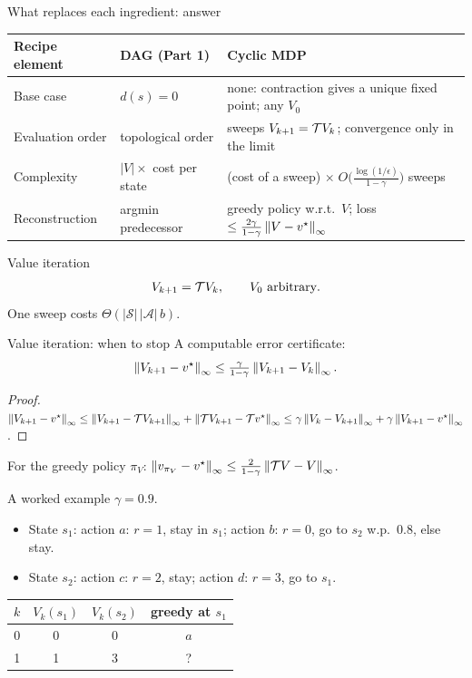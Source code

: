 \begin{frame}{What replaces each ingredient: answer}
	\footnotesize
	\renewcommand{\arraystretch}{1.3}
	\begin{tabular}{@{}p{}p{}p{}@{}}
		\toprule
		Recipe element & DAG (Part 1) & Cyclic MDP\\
		\midrule
		Base case & $d(s)=0$ & none: \alert{contraction} gives a unique fixed point; any $V_0$\\
		Evaluation order & topological order & sweeps $V_{k+1}=\mathcal{T} V_k$; convergence only in the limit\\
		Complexity & $|V|\times$ cost per state & (cost of a sweep) $\times\;O\bigl(\tfrac{\log(1/\epsilon)}{1-\gamma}\bigr)$ sweeps\\
		Reconstruction & argmin predecessor & greedy policy w.r.t.\ $V$; loss $\le\tfrac{2\gamma}{1-\gamma}\left\lVert V-v^\star\right\rVert_\infty$\\
		\bottomrule
	\end{tabular}
\end{frame}

\begin{frame}{Value iteration}
	\[
		V_{k+1}=\mathcal{T} V_k,\qquad V_0\text{ arbitrary}.
	\]
	One sweep costs $\Theta(|\mathcal S|\,|\mathcal A|\,b)$.
\end{frame}

\begin{frame}{Value iteration: when to stop}
	A computable error certificate:
	\[
		\left\lVert V_{k+1}-v^\star\right\rVert_\infty\le\tfrac{\gamma}{1-\gamma}\left\lVert V_{k+1}-V_k\right\rVert_\infty.
	\]
	\begin{proof}
		$\left\lVert V_{k+1}-v^\star\right\rVert_\infty\le\left\lVert V_{k+1}-\mathcal{T} V_{k+1}\right\rVert_\infty+\left\lVert \mathcal{T} V_{k+1}-\mathcal{T} v^\star\right\rVert_\infty
		\le\gamma\left\lVert V_k-V_{k+1}\right\rVert_\infty+\gamma\left\lVert V_{k+1}-v^\star\right\rVert_\infty$.
	\end{proof}
	For the greedy policy $\pi_V$: $\left\lVert v_{\pi_V}-v^\star\right\rVert_\infty\le\tfrac{2}{1-\gamma}\left\lVert \mathcal{T} V-V\right\rVert_\infty$.
\end{frame}

\begin{frame}{A worked example}
	$\gamma=0.9$.
	\begin{itemize}
		\item State $s_1$: action $a$: $r=1$, stay in $s_1$; action $b$: $r=0$, go to $s_2$ w.p.\ $0.8$, else stay.
		\item State $s_2$: action $c$: $r=2$, stay; action $d$: $r=3$, go to $s_1$.
	\end{itemize}

	\centering
	\renewcommand{\arraystretch}{1.1}
	\begin{tabular}{@{}cccc@{}}
		\toprule
		$k$ & $V_k(s_1)$ & $V_k(s_2)$ & greedy at $s_1$\\
		\midrule
		0 & 0 & 0 & $a$\\
		1 & 1 & 3 & ?\\
		\bottomrule
	\end{tabular}
\end{frame}

